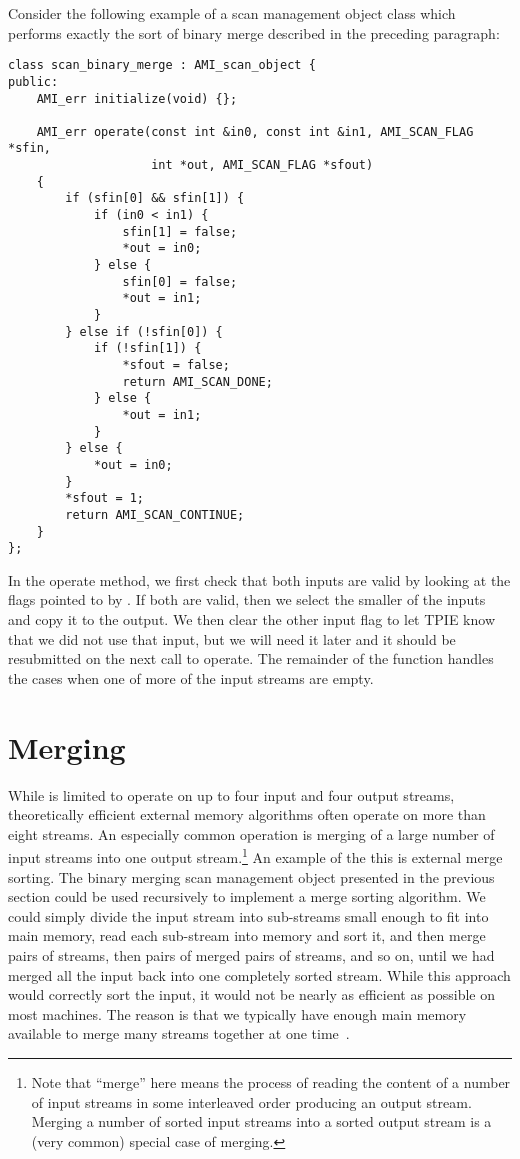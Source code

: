 Consider the following example of a scan management object class which
performs exactly the sort of binary
merge described in the
preceding paragraph:

\begin{verbatim}
class scan_binary_merge : AMI_scan_object {
public:
    AMI_err initialize(void) {};
    
    AMI_err operate(const int &in0, const int &in1, AMI_SCAN_FLAG *sfin,
                    int *out, AMI_SCAN_FLAG *sfout) 
    {
        if (sfin[0] && sfin[1]) {
            if (in0 < in1) {
                sfin[1] = false;
                *out = in0;
            } else {
                sfin[0] = false;
                *out = in1;
            }
        } else if (!sfin[0]) {
            if (!sfin[1]) {
                *sfout = false;
                return AMI_SCAN_DONE;
            } else {
                *out = in1;
            }
        } else {
            *out = in0;
        }
        *sfout = 1;
        return AMI_SCAN_CONTINUE;
    }
};
\end{verbatim}

In the operate method, we first check that both inputs are valid by
looking at the flags pointed to by .  If both are valid,
then we select the smaller of the inputs and copy it to the output.
We then clear the other input flag to let TPIE know that we did not
use that input, but we will need it later and it should be resubmitted
on the next call to operate. The remainder of the function handles
the cases when one of more of the input streams are empty.


\section{Merging} \label{sec:merging}

While  is limited to operate on up to four input and four
output streams, theoretically efficient external memory algorithms often
operate on more than eight streams. An especially common operation is
merging of a large number of input streams into one output
stream.\footnote{Note that ``merge'' here means the process of reading the
content of a number of input streams in some interleaved order producing an
output stream. Merging a number of sorted input streams into a sorted
output stream is a (very common) special case of merging.} An example of
the this is external merge sorting. The binary merging scan management
object presented in the previous section could be used recursively to
implement a merge sorting algorithm. We could
simply divide the input stream into sub-streams small enough to fit into
main memory, read each sub-stream into memory and sort it, and then merge
pairs of streams, then pairs of merged pairs of streams, and so on, until
we had merged all the input back into one completely sorted stream. While
this approach would correctly sort the input, it would not be nearly as
efficient as possible on most machines. The reason is that we typically
have enough main memory available to merge many streams together at one
time~\cite{aggarwal:input}.

